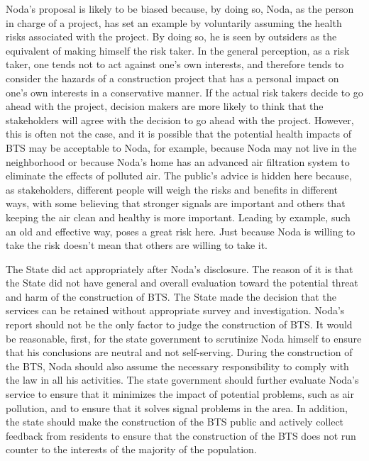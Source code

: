 \documentclass[a4paper,11pt]{article}
\begin{document}
Noda's proposal is likely to be biased because, by doing so, Noda, as the person in charge of a project, has set an example by voluntarily assuming the health risks associated with the project. By doing so, he is seen by outsiders as the equivalent of making himself the risk taker. In the general perception, as a risk taker, one tends not to act against one's own interests, and therefore tends to consider the hazards of a construction project that has a personal impact on one's own interests in a conservative manner. If the actual risk takers decide to go ahead with the project, decision makers are more likely to think that the stakeholders will agree with the decision to go ahead with the project. However, this is often not the case, and it is possible that the potential health impacts of BTS may be acceptable to Noda, for example, because Noda may not live in the neighborhood or because Noda's home has an advanced air filtration system to eliminate the effects of polluted air. The public's advice is hidden here because, as stakeholders, different people will weigh the risks and benefits in different ways, with some believing that stronger signals are important and others that keeping the air clean and healthy is more important. Leading by example, such an old and effective way, poses a great risk here. Just because Noda is willing to take the risk doesn't mean that others are willing to take it.

The State did act appropriately after Noda's disclosure. The reason of it is that the State did not have general and overall evaluation toward the potential threat and harm of the construction of BTS. The State made the decision that the services can be retained without appropriate survey and investigation. Noda's report should not be the only factor to judge the construction of BTS. It would be reasonable, first, for the state government to scrutinize Noda himself to ensure that his conclusions are neutral and not self-serving. During the construction of the BTS, Noda should also assume the necessary responsibility to comply with the law in all his activities. The state government should further evaluate Noda's service to ensure that it minimizes the impact of potential problems, such as air pollution, and to ensure that it solves signal problems in the area. In addition, the state should make the construction of the BTS public and actively collect feedback from residents to ensure that the construction of the BTS does not run counter to the interests of the majority of the population.
\end{document}
